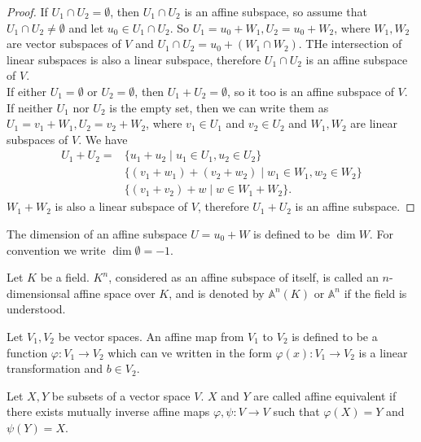 \documentclass[titlepage]{article}
\theoremstyle{remark}
\begin{document}
  \begin{proof}
    If $U_1\cap U_2=\emptyset$, then $U_1\cap U_2$ is an affine subspace, so assume that $U_1\cap U_2\ne\emptyset$ and let $u_0\in U_1\cap U_2$. 
    So $U_1=u_0+W_1, U_2=u_0+W_2$, where $W_1,W_2$ are vector subspaces of $V$ and $U_1\cap U_2=u_0+(W_1\cap W_2)$. THe intersection of linear subspaces is also a linear subspace, therefore $U_1\cap U_2$ is an affine subspace of $V$.\\
    If either $U_1=\emptyset$ or $U_2=\emptyset$, then $U_1+U_2=\emptyset$, so it too is an affine subspace of $V$.\\
    If neither $U_1$ nor $U_2$ is the empty set, then we can write them as $U_1=v_1+W_1,U_2=v_2+W_2$, where $v_1\in U_1$ and $v_2\in U_2$ and $W_1,W_2$ are linear subspaces of $V$. We have
    \begin{align*}
      U_1+U_2=&\{u_1+u_2\mid u_1\in U_1, u_2\in U_2\}\\
              &\{(v_1+w_1)+(v_2+w_2)\mid w_1\in W_1, w_2\in W_2\}\\
              &\{(v_1+v_2)+w\mid w\in W_1+W_2\}.
    \end{align*}
    $W_1+W_2$ is also a linear subspace of $V$, therefore $U_1+U_2$ is an affine subspace.
  \end{proof}
  \begin{definition}
    The dimension of an affine subspace $U=u_0+W$ is defined to be $\dim{W}$. For convention we write $\dim{\emptyset}=-1$.
  \end{definition}
  \begin{definition}
    Let $K$ be a field. $K^n$, considered as an affine subspace of itself, is called an $n$-dimensionsal affine space over $K$, and is denoted by $\mathbb{A}^n(K)$ or $\mathbb{A}^n$ if the field is understood.
  \end{definition}
  \begin{definition}
    Let $V_1,V_2$ be vector spaces. An affine map from $V_1$ to $V_2$ is defined to be a function $\varphi:V_1\to V_2$ which can ve written in the form $\varphi(x):V_1\to V_2$ is a linear transformation and $b\in V_2$.
  \end{definition}
  \begin{definition}
    Let $X,Y$ be subsets of a vector space $V$. $X$ and $Y$ are called affine equivalent if there exists mutually inverse affine maps $\varphi,\psi:V\to V$ such that $\varphi(X)=Y$ and $\psi(Y)=X$.
  \end{definition}
\end{document}
